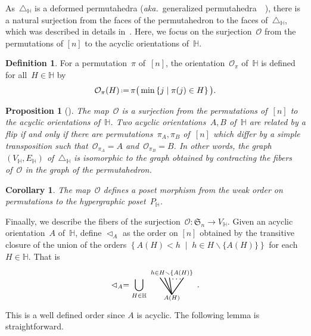 \documentclass[reqno]{amsart}
\newtheorem{corollary}[theorem]{Corollary}
\newtheorem{proposition}[theorem]{Proposition}
\theoremstyle{definition}
\newtheorem{definition}[theorem]{Definition}
\newcommand{\set}[2]{\left\{ #1 \;\middle|\; #2 \right\}} %
\newcommand{\ssm}{\smallsetminus} %
\newcommand{\eqdef}{\mbox{\,\raisebox{0.2ex}{\scriptsize\ensuremath{\mathrm:}}\ensuremath{=}\,}} %
\newcommand{\aka}{\textit{aka.}~} %
\newcommand{\fS}{\mathfrak{S}} %
\newcommand{\less}{\vartriangleleft} %
\newcommand{\Or}{\mathcal O}  %
\newcommand{\HH}{\mathbb H}  %
\begin{document}
As~$\triangle_\HH$ is a deformed permutahedra (\aka generalized permutahedra~~\cite{Postnikov, PostnikovReinerWilliams}), there is a natural surjection from the faces of the permutahedron to the faces of~$\triangle_\HH$, which was described in details in~\cite[Lem.~2.9]{BenedettiBergeronMachacek}.
Here, we focus on the surjection~$\Or$ from the permutations of $[n]$ to the acyclic orientations of~$\HH$.

\begin{definition}
For a permutation~$\pi$ of~$[n]$, the orientation~$\Or_\pi$ of~$\HH$ is defined for all~$H \in \HH$ by
\[
\Or_\pi(H) \eqdef  \pi\big(\min\set{j}{\pi(j)\in H}\big).
\]
\end{definition}

\begin{proposition}[{\cite[Lem.~2.9]{BenedettiBergeronMachacek}}]
The map~$\Or$ is a surjection from the permutations of~$[n]$ to the acyclic orientations of~$\HH$.
Two acyclic orientations~$A,B$ of~$\HH$ are related by a flip if and only if there are permutations~$\pi_A, \pi_B$ of~$[n]$ which differ by a simple transposition such that~$\Or_{\pi_A} = A$ and~$\Or_{\pi_B} = B$.
In other words, the graph~$(V_\HH, E_\HH)$ of~$\triangle_\HH$ is isomorphic to the graph obtained by contracting the fibers of~$\Or$ in the graph of the permutahedron.
\end{proposition}

\begin{corollary}
The map~$\Or$ defines a poset morphism from the weak order on permutations to the hypergraphic poset~$P_\HH$.
\end{corollary}

Finaally, we describe the fibers of the surjection~$\Or : \fS_n \to V_\HH$.
Given an acyclic orientation~$A$ of~$\HH$, define $\less_A$ as the order on $[n]$ obtained by the transitive closure of the union of the \linebreak orders $\set{A(H) < h}{h \in H \ssm \{A(H)\}}$ for each $H \in \HH$.
That is
\[
	\less_A =  \bigcup_{H \in \HH} 
	\begin{tikzpicture}[scale=1,baseline=.0cm]
		\node at (0,-.45) {$\scriptstyle A(H)$};
		\node at (0,.6) {$\scriptstyle h \in H \ssm \{A(H)\}$};
		\node at (.2,.35) {$\ldots$};
		\draw [thick] (0,-.3)--(-.5,.4); 
		\draw [thick] (0,-.3)--(-.3,.4); 
		\draw [thick] (0,-.3)--(-.1,.4); 
		\draw [thick] (0,-.3)--(.5,.4); 
	\end{tikzpicture} \,.
\]
This is a well defined order since $A$ is acyclic.
The following lemma is straightforward.
\end{document}
